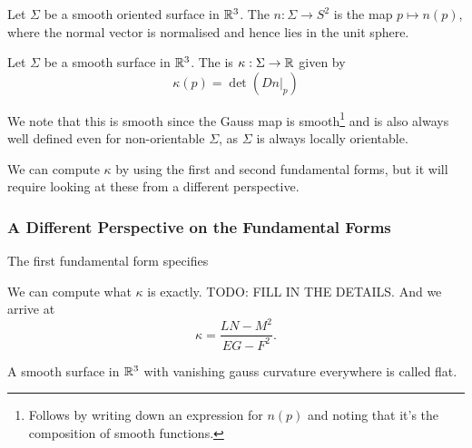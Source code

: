\documentclass[a4paper, 10pt, twocolumn]{amsart}
\begin{document}
\begin{definition}
    Let $\Sigma$ be a smooth oriented surface in $\mathbb{R}^3$. The  $n : \Sigma \rightarrow S^2$ is the map $p \mapsto n(p)$, where the normal vector is normalised and hence lies in the unit sphere.
\end{definition}



\begin{definition}
    Let $\Sigma$ be a smooth surface in $\mathbb{R}^3$. The  is $\kappa: \Sigma \rightarrow \mathbb{R}$ given by
    $$
    \kappa(p) = \det \left(\left.Dn\right|_p\right)
    $$
\end{definition}

We note that this is smooth since the Gauss map is smooth\footnote{Follows by writing down an expression for $n(p)$ and noting that it's the composition of smooth functions.} and is also always well defined even for non-orientable $\Sigma$, as $\Sigma$ is always locally orientable.

We can compute $\kappa$ by using the first and second fundamental forms, but it will require looking at these from a different perspective.

\subsubsection*{A Different Perspective on the Fundamental Forms}

The first fundamental form specifies 

We can compute what $\kappa$ is exactly.
{\color{red} TODO: FILL IN THE DETAILS}. And we arrive at
$$
\kappa = \frac{LN - M^2}{EG - F^2}.
$$


\begin{definition}
    A smooth surface in $\mathbb{R}^3$ with vanishing gauss curvature everywhere is called flat.
\end{definition}
\end{document}

